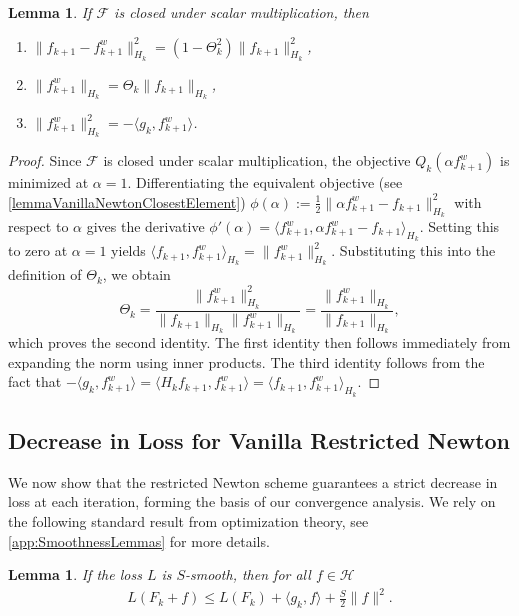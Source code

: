\documentclass{article}
\theoremstyle{plain}
\newtheorem{lemma}[theorem]{Lemma}
\theoremstyle{definition}
\theoremstyle{remark}
\begin{document}
\begin{lemma}\label{lemmaCosineAngleProperties}
    If $\mathcal{F}$ is closed under scalar multiplication, then
    \begin{enumerate}
        \item $\|f_{k+1} - f_{k+1}^w\|^2_{H_k} = (1-\Theta_k^2) \|f_{k+1}\|^2_{H_k}$,
        \item $\|f_{k+1}^w\|_{H_k} = \Theta_k \|f_{k+1}\|_{H_k}$,
        \item $ \|f^w_{k+1}\|_{H_k}^2 = -\langle g_k, f_{k+1}^w\rangle$.
    \end{enumerate}
\end{lemma}
\begin{proof}
    Since $\mathcal{F}$ is closed under scalar multiplication, the objective $Q_k(\alpha f_{k+1}^w)$ is minimized at $\alpha=1$. Differentiating the equivalent objective (see \cref{lemmaVanillaNewtonClosestElement}) $\phi(\alpha) := \frac{1}{2}\|\alpha f_{k+1}^w - f_{k+1}\|_{H_k}^2$ with respect to $\alpha$ gives the derivative $\phi'(\alpha) = \langle f_{k+1}^w, \alpha f_{k+1}^w - f_{k+1} \rangle_{H_k}$. Setting this to zero at $\alpha=1$ yields
    $
        \langle f_{k+1}, f_{k+1}^w \rangle_{H_k} = \|f_{k+1}^w\|_{H_k}^2.
    $
    Substituting this into the definition of $\Theta_k$, we obtain
    \begin{equation}
        \Theta_k = \frac{\|f_{k+1}^w\|_{H_k}^2}{\|f_{k+1}\|_{H_k} \|f_{k+1}^w\|_{H_k}} = \frac{\|f_{k+1}^w\|_{H_k}}{\|f_{k+1}\|_{H_k}},
    \end{equation}
    which proves the second identity. The first identity then follows immediately from expanding the norm using inner products. The third identity follows from the fact that $-\langle g_k, f_{k+1}^w\rangle = \langle H_k f_{k+1}, f_{k+1}^w\rangle = \langle f_{k+1}, f_{k+1}^w\rangle_{H_k}$.
\end{proof}


\subsection{Decrease in Loss for Vanilla Restricted Newton}

We now show that the restricted Newton scheme guarantees a strict decrease in loss at each iteration, forming the basis of our convergence analysis. We rely on the following standard result from optimization theory, see \cref{app:SmoothnessLemmas} for more details.

\begin{lemma}\label{lemmaStandardSmoothnessUpperBound}
    If the loss $L$ is $S$-smooth, then for all $f\in\mathcal{H}$
    \begin{align}
        L(F_k+f) \leq L(F_k) + \langle g_k, f\rangle + \frac{S}{2} \|f\|^2.
    \end{align}
\end{lemma}
\end{document}
